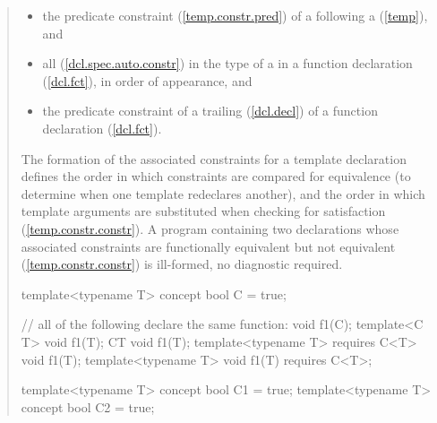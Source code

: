 \begin{quote}
\begin{itemize}
\item the predicate constraint (\ref{temp.constr.pred}) 
      of a  following a 
       (\ref{temp}), and

\item all  
      (\ref{dcl.spec.auto.constr}) in the type of a 
       in a function declaration
      (\ref{dcl.fct}), in order of appearance, and

\item the predicate constraint of a trailing 
       (\ref{dcl.decl}) 
      of a function declaration (\ref{dcl.fct}).
\end{itemize}
% 
The formation of the associated constraints for a template declaration
defines the order in which constraints are compared for equivalence
(to determine when one template redeclares another), and the order in
which template arguments are substituted when checking for satisfaction
(\ref{temp.constr.constr}).
% 
A program containing two declarations whose associated constraints are 
functionally equivalent but not equivalent (\ref{temp.constr.constr}) is 
ill-formed, no diagnostic required.
% 
\enterexample
\begin{codeblock}
template<typename T> concept bool C = true;

// all of the following declare the same function:
void f1(C);
template<C T> void f1(T);
C{T} void f1(T);
template<typename T> requires C<T> void f1(T);
template<typename T> void f1(T) requires C<T>;
\end{codeblock}
\exitexample
% 
\enterexample
\begin{codeblock}
template<typename T> concept bool C1 = true;
template<typename T> concept bool C2 = true;


\end{codeblock}
\end{quote}
